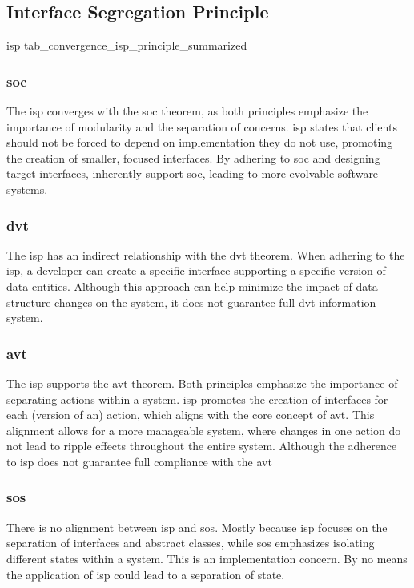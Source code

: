 \subsection{Interface Segregation Principle}

\compareTable
{\acrlong*{isp}}
{tab_convergence_isp_principle_summarized}
{\addEvalRow{\conv & \partconv & \partconv & \noconv}}

\subsubsection{\acrlong*{soc}}
The \gls{isp} converges with the \gls{soc} theorem, as both principles emphasize the
importance of modularity and the separation of concerns. \gls{isp} states that clients
should not be forced to depend on implementation they do not use, promoting the creation
of smaller, focused interfaces. By adhering to \gls{soc} and designing target interfaces,
inherently support \gls{soc}, leading to more evolvable software systems.

\subsubsection{\acrlong*{dvt}} The \gls{isp} has an indirect relationship with the
\gls{dvt} theorem. When adhering to the \gls{isp}, a developer can create a specific
interface supporting a specific version of data entities. Although this approach can help
minimize the impact of data structure changes on the system, it does not guarantee full
\gls{dvt} information system.

\subsubsection{\acrlong*{avt}} The \gls{isp} supports the \gls{avt} theorem. Both
principles emphasize the importance of separating actions within a system. \gls{isp}
promotes the creation of interfaces for each (version of an) action, which aligns with the
core concept of \gls{avt}. This alignment allows for a more manageable system, where
changes in one action do not lead to ripple effects throughout the entire system. Although
the adherence to \gls{isp} does not guarantee full compliance with the \gls{avt}

\subsubsection{\acrlong*{sos}} There is no alignment between \gls{isp} and \gls{sos}.
Mostly because \gls{isp} focuses on the separation of interfaces and abstract classes,
while \gls{sos} emphasizes isolating different states within a system. This is an
implementation concern. By no means the application of \gls{isp} could lead to a
separation of state.
